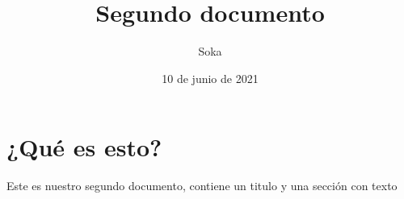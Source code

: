 \documentclass[a4paper,11pt]{article}
\begin{document}
	\title{Segundo documento}
	\author{Soka}
	\date{10 de junio de 2021}
	\maketitle

	\section{¿Qué es esto?}
		Este es nuestro segundo documento, contiene un titulo y una sección con texto
\end{document}
